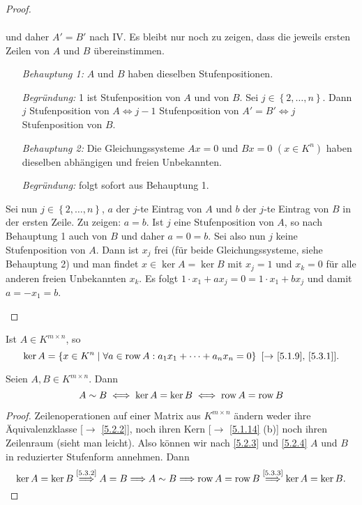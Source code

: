 \documentclass[../../main.tex]{subfiles}
\begin{document}
\begin{proof}
\begin{itemize}
\begin{enumerate}[{Fall }1:]
\begin{align*}
\end{align*}
und daher $A'=B'$ nach IV. Es bleibt nur noch zu zeigen, dass die jeweils ersten Zeilen von $A$ und $B$ übereinstimmen.
\begin{itemize}
\item[\emph{Behauptung 1:}] $A$ und $B$ haben dieselben Stufenpositionen.
\item[\emph{Begründung:}] 1 ist Stufenposition von $A$ und von $B$. Sei $j\in \left\{2,\ldots, n\right\}$. Dann $j$ Stufenposition von $A\iff j-1$ Stufenposition von $A' = B'\iff j$ Stufenposition von $B$.
\item[\emph{Behauptung 2:}] Die Gleichungssysteme $Ax = 0$ und $Bx = 0$ $(x\in K^n)$ haben dieselben abhängigen und freien Unbekannten.
\item[\emph{Begründung:}] folgt sofort aus Behauptung 1.
\end{itemize}
Sei nun $j\in \left\{2,\ldots,n\right\}$, $a$ der $j$-te Eintrag von $A$ und $b$ der $j$-te Eintrag von $B$ in der ersten Zeile. Zu zeigen: $a = b$. Ist $j$ eine Stufenposition von $A$, so nach Behauptung 1 auch von $B$ und daher $a = 0 = b$.
Sei also nun $j$ keine Stufenposition von $A$. Dann ist $x_j$ frei (für beide Gleichungssysteme, siehe Behauptung 2) und man findet $x\in \ker A = \ker B$ mit $x_j = 1$ und $x_k = 0$ für alle anderen freien Unbekannten $x_k$. Es folgt $1\cdot x_1 + a x_j = 0 = 1\cdot x_1+ bx_j$ und damit $a = -x_1 = b$.\qedhere
\end{enumerate}
\end{itemize}
\end{proof}

\begin{bem}\label{5.3.3}
Ist $A\in K^{m\times n}$, so
$$\ker A = \left\{x\in K^n\mid \forall a\in \operatorname{row} A: a_1x_1+\dots+a_nx_n = 0\right\}\text{ [$\to$ \ref{5.1.9}, \ref{5.3.1}].}$$
\end{bem}

\begin{sat}\label{5.3.4}
Seien $A,B\in K^{m\times n}$. Dann
$$A\sim B \iff \ker A = \ker B\iff \operatorname{row} A = \operatorname{row} B$$
\end{sat}
\begin{proof}
Zeilenoperationen auf einer Matrix aus $K^{m\times n}$ ändern weder ihre Äquivalenzklasse [$\to$ \ref{5.2.2}], noch ihren Kern [$\to$ \ref{5.1.14} (b)] noch ihren Zeilenraum (sieht man leicht). Also können wir nach \ref{5.2.3} und \ref{5.2.4} $A$ und $B$ in reduzierter Stufenform annehmen. Dann
$$\ker A = \ker B \overset{\text{\ref{5.3.2}}}{\Longrightarrow} A = B \Longrightarrow A \sim B \Longrightarrow \operatorname{row} A = \operatorname{row} B \overset{\text{\ref{5.3.3}}}{\Longrightarrow} \ker A = \ker B.$$
\end{proof}
\end{document}
